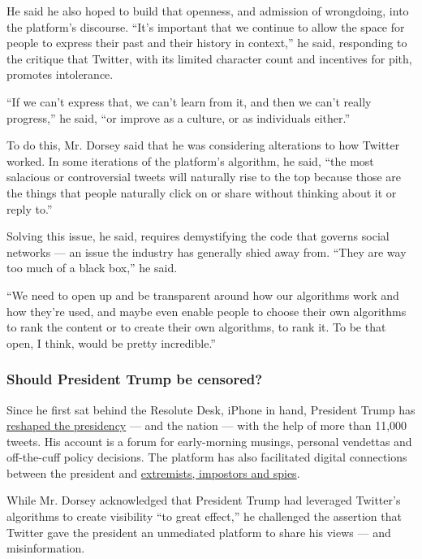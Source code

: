 He said he also hoped to build that openness, and admission of
wrongdoing, into the platform's discourse. ``It's important that we
continue to allow the space for people to express their past and their
history in context,'' he said, responding to the critique that Twitter,
with its limited character count and incentives for pith, promotes
intolerance.

``If we can't express that, we can't learn from it, and then we can't
really progress,'' he said, ``or improve as a culture, or as individuals
either.''

To do this, Mr. Dorsey said that he was considering alterations to how
Twitter worked. In some iterations of the platform's algorithm, he said,
``the most salacious or controversial tweets will naturally rise to the
top because those are the things that people naturally click on or share
without thinking about it or reply to.''

Solving this issue, he said, requires demystifying the code that governs
social networks --- an issue the industry has generally shied away from.
``They are way too much of a black box,'' he said.

``We need to open up and be transparent around how our algorithms work
and how they're used, and maybe even enable people to choose their own
algorithms to rank the content or to create their own algorithms, to
rank it. To be that open, I think, would be pretty incredible.''

\hypertarget{should-president-trump-be-censored}{%
\subsubsection{Should President Trump be
censored?}\label{should-president-trump-be-censored}}

Since he first sat behind the Resolute Desk, iPhone in hand, President
Trump has
\href{https://www.nytimes3xbfgragh.onion/interactive/2019/11/02/us/politics/trump-twitter-presidency.html}{reshaped
the presidency} --- and the nation --- with the help of more than 11,000
tweets. His account is a forum for early-morning musings, personal
vendettas and off-the-cuff policy decisions. The platform has also
facilitated digital connections between the president and
\href{https://www.nytimes3xbfgragh.onion/interactive/2019/11/02/us/politics/trump-twitter-disinformation.html}{extremists,
impostors and spies}.

While Mr. Dorsey acknowledged that President Trump had leveraged
Twitter's algorithms to create visibility ``to great effect,'' he
challenged the assertion that Twitter gave the president an unmediated
platform to share his views --- and misinformation.

